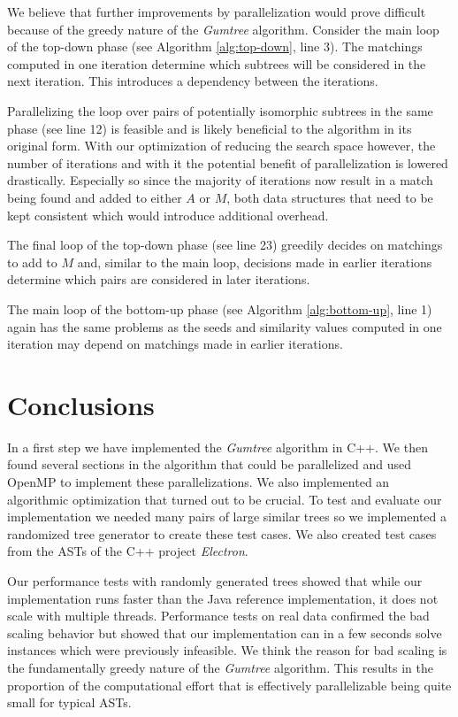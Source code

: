 \documentclass[letterpaper]{article}
\begin{document}
We believe that further improvements by parallelization would prove difficult because of the greedy nature of the \emph{Gumtree} algorithm.
Consider the main loop of the top-down phase (see Algorithm \ref{alg:top-down}, line 3).
The matchings computed in one iteration determine which subtrees will be considered in the next iteration.
This introduces a dependency between the iterations.

Parallelizing the loop over pairs of potentially isomorphic subtrees in the same phase (see line 12) is feasible and is likely beneficial to the algorithm in its original form.
With our optimization of reducing the search space however, the number of iterations and with it the potential benefit of parallelization is lowered drastically.
Especially so since the majority of iterations now result in a match being found and added to either $A$ or $M$, both data structures that need to be kept consistent which would introduce additional overhead.

The final loop of the top-down phase (see line 23) greedily decides on matchings to add to $M$ and, similar to the main loop, decisions made in earlier iterations determine which pairs are considered in later iterations.

The main loop of the bottom-up phase (see Algorithm \ref{alg:bottom-up}, line 1) again has the same problems as the seeds and similarity values computed in one iteration may depend on matchings made in earlier iterations.

\section{Conclusions}

In a first step we have implemented the \emph{Gumtree} algorithm in C++.
We then found several sections in the algorithm that could be parallelized and used OpenMP to implement these parallelizations.
We also implemented an algorithmic optimization that turned out to be crucial.
To test and evaluate our implementation we needed many pairs of large similar trees so we implemented a randomized tree generator to create these test cases.
We also created test cases from the ASTs of the C++ project \emph{Electron}.

Our performance tests with randomly generated trees showed that while our implementation runs faster than the Java reference implementation, it does not scale with multiple threads.
Performance tests on real data confirmed the bad scaling behavior but showed that our implementation can in a few seconds solve instances which were previously infeasible.
We think the reason for bad scaling is the fundamentally greedy nature of the \emph{Gumtree} algorithm.
This results in the proportion of the computational effort that is effectively parallelizable being quite small for typical ASTs.
\end{document}
